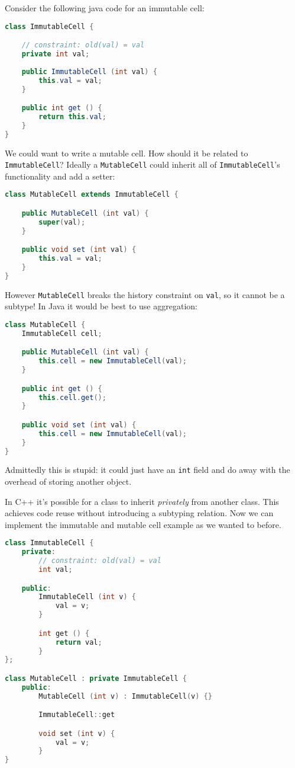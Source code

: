 \documentclass{article}
\begin{document}
\begin{example}
Consider the following java code for an immutable cell:
\begin{lstlisting}[language=Java]
class ImmutableCell {

    // constraint: old(val) = val
    private int val;
    
    public ImmutableCell (int val) {
        this.val = val;
    }

    public int get () {
        return this.val;
    }
}
\end{lstlisting}
We could want to write a mutable cell. How should it be related to \\ \texttt{ImmutableCell}?
Ideally a \texttt{MutableCell} could inherit all of \texttt{ImmutableCell}'s functionality and add a setter:
\begin{lstlisting}[language=Java]
class MutableCell extends ImmutableCell {

    public MutableCell (int val) {
        super(val);
    }

    public void set (int val) {
        this.val = val;
    }
}
\end{lstlisting}
However \texttt{MutableCell} breaks the history constraint on \texttt{val}, so it cannot be a \behavioral{} subtype! In Java it would be best to use aggregation:
\begin{lstlisting}[language=Java]
class MutableCell {
    ImmutableCell cell;

    public MutableCell (int val) {
        this.cell = new ImmutableCell(val);
    }

    public int get () {
        this.cell.get();
    }

    public void set (int val) {
        this.cell = new ImmutableCell(val);
    }
}
\end{lstlisting}
Admittedly this is stupid: it could just have an \texttt{int} field and do away with the overhead of storing another object.
\end{example}

\begin{example}
In C++ it's possible for a class to inherit \textit{privately} from another class. This achieves code reuse without introducing a subtyping relation. Now we can implement the immutable and mutable cell example as we wanted to before.
\begin{lstlisting}[language=C++]
class ImmutableCell {
    private:
        // constraint: old(val) = val
        int val;

    public:
        ImmutableCell (int v) {
            val = v;
        }

        int get () {
            return val;
        }
};

class MutableCell : private ImmutableCell {
    public:
        MutableCell (int v) : ImmutableCell(v) {}

        ImmutableCell::get

        void set (int v) {
            val = v;
        }
}
\end{lstlisting}
\end{example}
\end{document}
